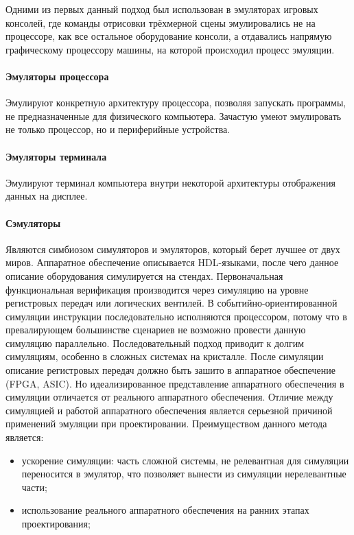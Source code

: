 Одними из первых данный подход был использован в эмуляторах игровых консолей, где команды отрисовки трёхмерной сцены
эмулировались не на процессоре, как все остальное оборудование консоли, а отдавались напрямую
графическому процессору машины, на которой происходил процесс эмуляции.


\paragraph{Эмуляторы процессора}\label{cpu-emu}

Эмулируют конкретную архитектуру процессора, позволяя запускать программы, не предназначенные для физического компьютера.
Зачастую умеют эмулировать не только процессор, но и периферийные устройства.


\paragraph{Эмуляторы терминала}\label{term-emu}

Эмулируют терминал компьютера внутри некоторой архитектуры отображения данных на дисплее.


\paragraph{Сэмуляторы}\label{sim-emu}

Являются симбиозом симуляторов и эмуляторов, который берет лучшее от двух миров.
Аппаратное обеспечение описывается HDL-языками, после чего данное описание оборудования симулируется на стендах.
Первоначальная функциональная верификация производится через симуляцию на уровне регистровых передач или логических вентилей.
В событийно-ориентированной симуляции инструкции последовательно исполняются процессором, потому что в превалирующем большинстве
сценариев не возможно провести данную симуляцию параллельно. Последовательный подход приводит к долгим симуляциям, особенно в
сложных системах на кристалле.
После симуляции описание регистровых передач должно быть зашито в аппаратное обеспечение (FPGA, ASIC).
Но идеализированное представление аппаратного обеспечения в симуляции отличается от реального аппаратного обеспечения.
Отличие между симуляцией и работой аппаратного обеспечения является серьезной причиной применений эмуляции при
проектировании.
Преимуществом данного метода является:
\begin{itemize}
    \item ускорение симуляции: часть сложной системы, не релевантная для симуляции переносится в эмулятор,
        что позволяет вынести из симуляции нерелевантные части;
    \item использование реального аппаратного обеспечения на ранних этапах проектирования;
\end{itemize}

